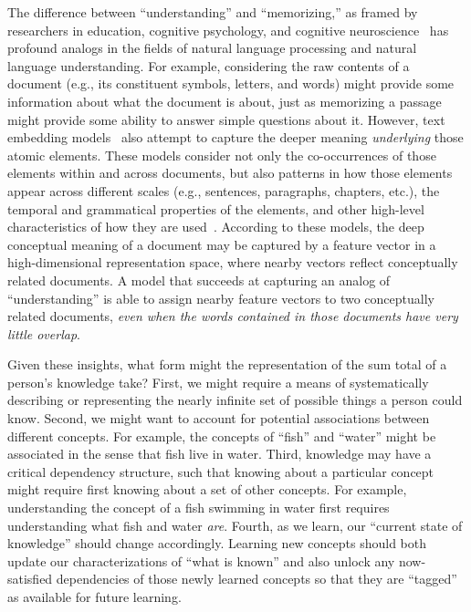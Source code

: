 \documentclass[10pt]{article}
\begin{document}
The difference between ``understanding'' and ``memorizing,'' as framed by
researchers in education, cognitive psychology, and cognitive
neuroscience~\citep[e.g.,][]{Kato40, Gall00, ScotEtal07, HallGree08, Macl05}
has profound analogs in the fields of natural language processing and natural
language understanding. For example, considering the raw contents of a document
(e.g., its constituent symbols, letters, and words) might provide some
information about what the document is about, just as memorizing a passage
might provide some ability to answer simple questions about it. However, text
embedding models~\citep[e.g.,][]{LandDuma97, DeerEtal90, BleiEtal03,
BleiLaff06, MikoEtal13a, CerEtal18, BrowEtal20} also attempt to capture the
deeper meaning \textit{underlying} those atomic elements. These models consider
not only the co-occurrences of those elements within and across documents, but
also patterns in how those elements appear across different scales (e.g.,
sentences, paragraphs, chapters, etc.), the temporal and grammatical properties
of the elements, and other high-level characteristics of how they are
used~\citep{Mann20, Mann21a}. According to these models, the deep conceptual
meaning of a document may be captured by a feature vector in a high-dimensional
representation space, where nearby vectors reflect conceptually related
documents. A model that succeeds at capturing an analog of ``understanding'' is
able to assign nearby feature vectors to two conceptually related documents,
\textit{even when the words contained in those documents have very little
overlap}.

Given these insights, what form might the representation of the sum total of a
person's knowledge take? First, we might require a means of systematically
describing or representing the nearly infinite set of possible things a person
could know. Second, we might want to account for potential associations between
different concepts. For example, the concepts of ``fish'' and ``water'' might
be associated in the sense that fish live in water. Third, knowledge may have a
critical dependency structure, such that knowing about a particular concept
might require first knowing about a set of other concepts. For example,
understanding the concept of a fish swimming in water first requires
understanding what fish and water \textit{are}. Fourth, as we learn, our
``current state of knowledge'' should change accordingly. Learning new concepts
should both update our characterizations of ``what is known'' and also
unlock any now-satisfied dependencies of those newly learned concepts so that
they are ``tagged'' as available for future learning.
\end{document}
